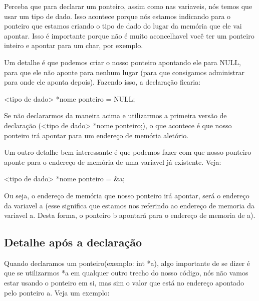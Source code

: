 \documentclass{report}
\begin{document}
	Perceba que para declarar um ponteiro, assim como nas variaveis, nós temos que usar um tipo de dado. Isso acontece porque nós estamos indicando para o ponteiro que estamos criando o tipo de dado do lugar da memória que ele vai apontar. Isso é importante porque não é muito aconcelhavel você ter um ponteiro inteiro e apontar para um char, por exemplo.
	
	Um detalhe é que podemos criar o nosso ponteiro apontando ele para NULL, para que ele não aponte para nenhum lugar (para que consigamos administrar para onde ele aponta depois). Fazendo isso, a declaração ficaria:
	
	\begin{LARGE}
		\begin{center}
			<tipo de dado> *nome ponteiro = NULL;
		\end{center}
	\end{LARGE}
	
	Se não declararmos da maneira acima e utilizarmos a primeira versão de declaração (<tipo de dado> *nome ponteiro;), o que acontece é que nosso ponteiro irá apontar para um endereço de memória aletório.
	
	Um outro detalhe bem interessante é que podemos fazer com que nosso ponteiro aponte para o endereço de memória de uma variavel já existente. Veja:
	
	\begin{LARGE}
		\begin{center}
			<tipo de dado> *nome ponteiro = \&a;
		\end{center}
	\end{LARGE}
	
	
	Ou seja, o endereço de memória que nosso ponteiro irá apontar, será o endereço da variavel a (esse  significa que estamos nos referindo ao endereço de memoria da variavel a. Desta forma, o ponteiro b apontará para o endereço de memoria de a).
	
	\subsection{Detalhe após a declaração}
	
	Quando declaramos um ponteiro(exemplo: int *a), algo importante de se dizer é que se utilizarmos *a em qualquer outro trecho do nosso código, nós não vamos estar usando o ponteiro em si, mas sim o valor que está no endereço apontado pelo ponteiro a. Veja um exemplo:
	
\end{document}
